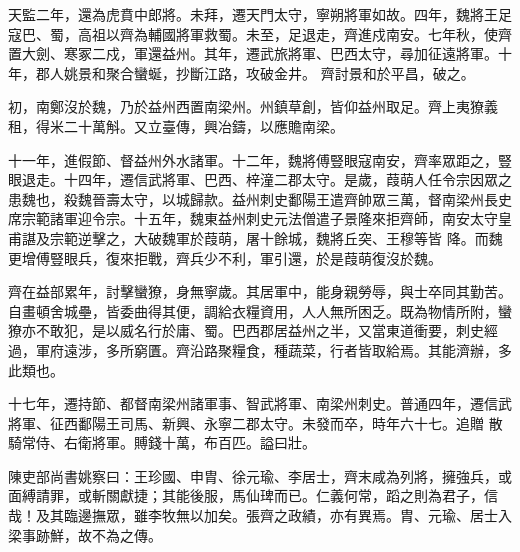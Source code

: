 \begin{pinyinscope}
 天監二年，還為虎賁中郎將。未拜，遷天門太守，寧朔將軍如故。四年，魏將王足寇巴、蜀，高祖以齊為輔國將軍救蜀。未至，足退走，齊進戍南安。七年秋，使齊置大劍、寒冢二戍，軍還益州。其年，遷武旅將軍、巴西太守，尋加征遠將軍。十年，郡人姚景和聚合蠻蜒，抄斷江路，攻破金井。
 齊討景和於平昌，破之。



 初，南鄭沒於魏，乃於益州西置南梁州。州鎮草創，皆仰益州取足。齊上夷獠義租，得米二十萬斛。又立臺傳，興冶鑄，以應贍南梁。



 十一年，進假節、督益州外水諸軍。十二年，魏將傅豎眼寇南安，齊率眾距之，豎眼退走。十四年，遷信武將軍、巴西、梓潼二郡太守。是歲，葭萌人任令宗因眾之患魏也，殺魏晉壽太守，以城歸款。益州刺史鄱陽王遣齊帥眾三萬，督南梁州長史席宗範諸軍迎令宗。十五年，魏東益州刺史元法僧遣子景隆來拒齊師，南安太守皇甫諶及宗範逆擊之，大破魏軍於葭萌，屠十餘城，魏將丘突、王穆等皆
 降。而魏更增傅豎眼兵，復來拒戰，齊兵少不利，軍引還，於是葭萌復沒於魏。



 齊在益部累年，討擊蠻獠，身無寧歲。其居軍中，能身親勞辱，與士卒同其勤苦。自畫頓舍城壘，皆委曲得其便，調給衣糧資用，人人無所困乏。既為物情所附，蠻獠亦不敢犯，是以威名行於庸、蜀。巴西郡居益州之半，又當東道衝要，刺史經過，軍府遠涉，多所窮匱。齊沿路聚糧食，種蔬菜，行者皆取給焉。其能濟辦，多此類也。



 十七年，遷持節、都督南梁州諸軍事、智武將軍、南梁州刺史。普通四年，遷信武將軍、征西鄱陽王司馬、新興、永寧二郡太守。未發而卒，時年六十七。追贈
 散騎常侍、右衛將軍。賻錢十萬，布百匹。謚曰壯。



 陳吏部尚書姚察曰：王珍國、申胄、徐元瑜、李居士，齊末咸為列將，擁強兵，或面縛請罪，或斬關獻捷；其能後服，馬仙琕而已。仁義何常，蹈之則為君子，信哉！及其臨邊撫眾，雖李牧無以加矣。張齊之政績，亦有異焉。胄、元瑜、居士入梁事跡鮮，故不為之傳。



\end{pinyinscope}